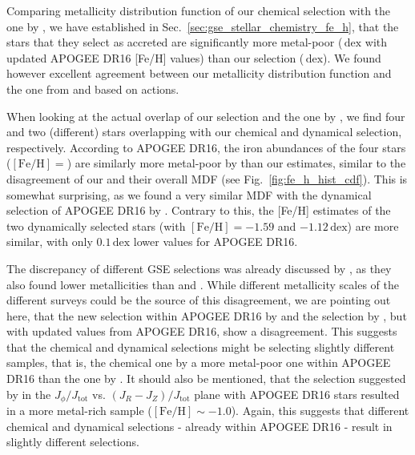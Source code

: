 \documentclass[fleqn,usenatbib]{mnras}
\newcommand{\dex}{\,\mathrm{dex}}	%
\begin{document}
Comparing metallicity distribution function of our chemical selection with the one by \citet{Das2020}, we have established in Sec.~\ref{sec:gse_stellar_chemistry_fe_h}, that the stars that they select as accreted are significantly more metal-poor ($\dex$ with updated APOGEE DR16 [Fe/H] values) than our selection ($\dex$). We found however excellent agreement between our metallicity distribution function and the one from \citet{Naidu2020} and \citet{Feuillet2020,Feuillet2021} based on actions.

When looking at the actual overlap of our selection and the one by \citet{Das2020}, we find four and two (different) stars overlapping with our chemical and dynamical selection, respectively. According to APOGEE DR16, the iron abundances of the four stars ($\mathrm{[Fe/H]} = $) are similarly more metal-poor by  than our estimates, similar to the disagreement of our and their overall MDF (see Fig.~\ref{fig:fe_h_hist_cdf}). This is somewhat surprising, as we found a very similar MDF with the dynamical selection of APOGEE DR16 by \citet{Feuillet2021}. Contrary to this, the [Fe/H] estimates of the two dynamically selected stars (with $\mathrm{[Fe/H]} = -1.59$ and $-1.12\dex$) are more similar, with only $0.1\dex$ lower values for APOGEE DR16.

The discrepancy of different GSE selections was already discussed by \citet{Bonifacio2021}, as they also found lower metallicities than \citet{Naidu2020} and \citet{Feuillet2020}. While different metallicity scales of the different surveys could be the source of this disagreement, we are pointing out here, that the new selection within APOGEE DR16 by \citet{Feuillet2021} and the selection by \citet{Das2020}, but with updated values from APOGEE DR16, show a disagreement. This suggests that the chemical and dynamical selections might be selecting slightly different samples, that is, the chemical one by \citet{Das2020} a more metal-poor one within APOGEE DR16 than the one by \citet{Feuillet2021}. It should also be mentioned, that the selection suggested by \citet{Myeong2019} in the $J_\phi/J_\text{tot}$ vs. $\left(J_R - J_Z\right)/J_\text{tot}$ plane with APOGEE DR16 stars resulted in a more metal-rich sample ($\mathrm{[Fe/H]} \sim -1.0$). Again, this suggests that different chemical and dynamical selections - already within APOGEE DR16 - result in slightly different selections.
\end{document}
